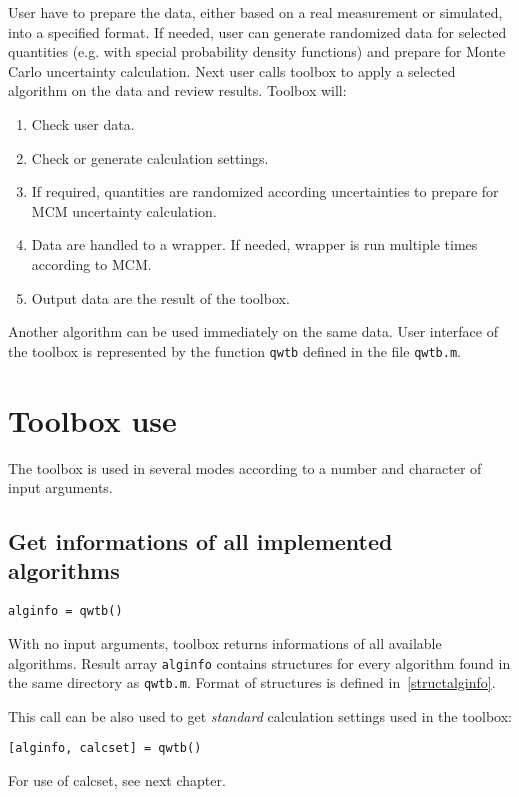 \documentclass[12pt,a4paper,oneside]{report} %
\newcommand{\li}[1]{\lstinline{#1}}     %
\begin{document}
User have to prepare the data, either based on a real measurement or simulated, into a specified
format. If needed, user can generate randomized data for selected quantities (e.g. with special
probability density functions) and prepare for Monte Carlo uncertainty calculation. Next user calls
toolbox to apply a selected algorithm on the data and review results. Toolbox will:
\begin{enumerate}
        \item Check user data.
        \item Check or generate calculation settings.
        \item If required, quantities are randomized according uncertainties to prepare for MCM uncertainty calculation.
        \item Data are handled to a wrapper. If needed, wrapper is run multiple times according to MCM.
        \item Output data are the result of the toolbox.
\end{enumerate}

Another algorithm can be used immediately on the same data. User interface of the toolbox is represented
by the function \li{qwtb} defined in the file {\tt qwtb.m}.

\section{Toolbox use} %
The toolbox is used in several modes according to a number and character of input arguments.

\subsection{Get informations of all implemented algorithms} %
\begin{lstlisting}
alginfo = qwtb()
\end{lstlisting}

With no input arguments, toolbox returns informations of all available algorithms. Result array
\li{alginfo} contains structures for every algorithm found in the same directory as
\texttt{qwtb.m}. Format of structures is defined in~\ref{structalginfo}.

This call can be also used to get \emph{standard} calculation settings used in the toolbox:
\begin{lstlisting}
[alginfo, calcset] = qwtb()
\end{lstlisting}
For use of calcset, see next chapter.
\end{document}
